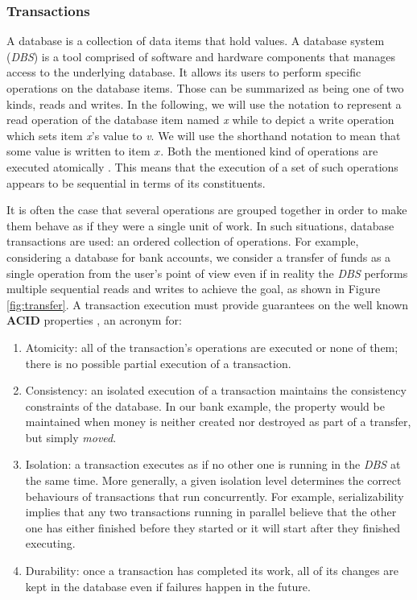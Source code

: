 \tocless\subsubsection{Transactions}

A database is a collection of data items that hold values. A database system (\textit{DBS}) is a tool comprised of software and hardware components that manages access to the underlying database. It allows its users to perform specific operations on the database items. Those can be summarized as being one of two kinds, reads and writes. In the following, we will use the notation  to represent a read operation of the database item named \textit{x} while  to depict a write operation which sets item \textit{x}'s value to \textit{v}. We will use the shorthand notation  to mean that some value is written to item $x$. Both the mentioned kind of operations are executed atomically \cite{ccontrol}. This means that the execution of a set of such operations appears to be sequential in terms of its constituents.

It is often the case that several operations are grouped together in order to make them behave as if they were a single unit of work. In such situations, database transactions are used: an ordered collection of operations. For example, considering a database for bank accounts, we consider a transfer of funds as a single operation from the user's point of view even if in reality the \textit{DBS} performs multiple sequential reads and writes to achieve the goal, as shown in Figure \ref{fig:transfer}. A transaction execution must provide guarantees on the well known \textbf{ACID} properties \cite{dbconcepts}, an acronym for:
\begin{enumerate}[ref=(\arabic*)]
\item \label{acid.a} Atomicity: all of the transaction's operations are executed or none of them; there is no possible partial execution of a transaction.
\item \label{acid.c} Consistency: an isolated execution of a transaction maintains the consistency constraints of the database. In our bank example, the property would be maintained when money is neither created nor destroyed as part of a transfer, but simply \textit{moved}.
\item \label{acid.i} Isolation: a transaction executes as if no other one is running in the \textit{DBS} at the same time. More generally, a given isolation level determines the correct behaviours of transactions that run concurrently. For example, serializability implies that any two transactions running in parallel believe that the other one has either finished before they started or it will start after they finished executing.
\item \label{acid.d} Durability: once a transaction has completed its work, all of its changes are kept in the database even if failures happen in the future.
\end{enumerate}

